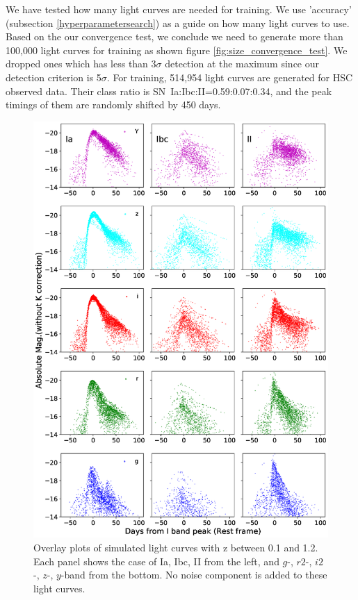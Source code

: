 \documentclass[proof]{pasj01}
\begin{document}
We have tested how many light curves are needed for training.  We use 'accuracy' (subsection \ref{hyperparametersearch}) as a guide on how many light curves to use.  
Based on the our convergence test, we conclude we need to generate more than 100,000 light curves for training as shown figure \ref{fig:size_convergence_test}.
We dropped ones which has less than 3$\sigma$ detection at the maximum since our detection criterion is 5$\sigma$. %
For training, 514,954 light curves are generated for HSC observed data. 
Their class ratio is SN~Ia:Ibc:II=0.59:0.07:0.34, and the peak timings of them are randomly shifted by 450 days.
%
%
\begin{figure}[htbp]
  \begin{center}
     \includegraphics[width=130mm]{figures/SimLCsamples.eps}
  \end{center}
  \vspace{-6mm}
  \caption{%
  Overlay plots of simulated light curves with z between 0.1 and 1.2.
  Each panel shows the case of Ia, Ibc, II from the left, and $g$-, $r2$-, $i2$-, $z$-, $y$-band from the bottom.
  No noise component is added to these light curves.
  }%
  
  \label{fig:simLCsamples}
\end{figure}
\end{document}
